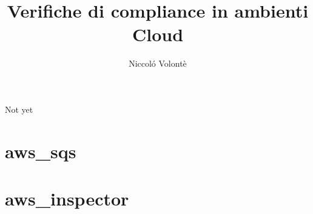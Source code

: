 \documentclass[twoside,12pt]{report}
\title{Verifiche di compliance in ambienti Cloud}
\author{Niccoló Volontè}
\begin{document}
    
    \makecenteredfrontpage
    
    
    	
    	
    	
    
    
    
    
    
    Not yet
    
    
    \afterpreface
    
    
    
    
    

    
    
    
    
    
    
    
    \appendix
    \chapter{aws\_sqs}
    \label{app:sqs}
    
    
    \chapter{aws\_inspector}
    \label{app:inspector}
    
\end{document}

